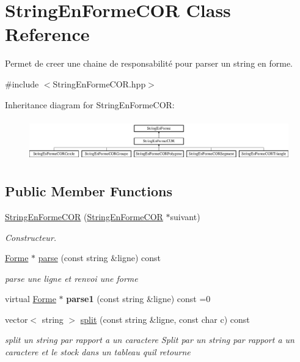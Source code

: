 \hypertarget{class_string_en_forme_c_o_r}{}\section{String\+En\+Forme\+C\+OR Class Reference}
\label{class_string_en_forme_c_o_r}


Permet de creer une chaine de responsabilité pour parser un string en forme.  




{\ttfamily \#include $<$String\+En\+Forme\+C\+O\+R.\+hpp$>$}

Inheritance diagram for String\+En\+Forme\+C\+OR\+:\begin{figure}[H]
\begin{center}
\leavevmode
\includegraphics[height=1.826087cm]{class_string_en_forme_c_o_r}
\end{center}
\end{figure}
\subsection*{Public Member Functions}
\begin{DoxyCompactItemize}
\item 
\mbox{\hyperlink{class_string_en_forme_c_o_r_a5fc0f41132d65a076009ddc5c4a8b1ee}{String\+En\+Forme\+C\+OR}} (\mbox{\hyperlink{class_string_en_forme_c_o_r}{String\+En\+Forme\+C\+OR}} $\ast$suivant)
\begin{DoxyCompactList}\small\item\em Constructeur. \end{DoxyCompactList}\item 
\mbox{\hyperlink{class_forme}{Forme}} $\ast$ \mbox{\hyperlink{class_string_en_forme_c_o_r_ab0b1d2efc8fdcf027cbc7241c498a024}{parse}} (const string \&ligne) const
\begin{DoxyCompactList}\small\item\em parse une ligne et renvoi une forme \end{DoxyCompactList}\item 
\mbox{\label{class_string_en_forme_c_o_r_a11d62ec377d6f255ae7265c4bb6ea1e5}} 
virtual \mbox{\hyperlink{class_forme}{Forme}} $\ast$ {\bfseries parse1} (const string \&ligne) const =0
\item 
vector$<$ string $>$ \mbox{\hyperlink{class_string_en_forme_c_o_r_aa184a9544ad408ee03ccb0cae5b742e4}{split}} (const string \&ligne, const char c) const
\begin{DoxyCompactList}\small\item\em split un string par rapport a un caractere Split par un string par rapport a un caractere et le stock dans un tableau qu\textquotesingle{}il retourne \end{DoxyCompactList}\end{DoxyCompactItemize}


